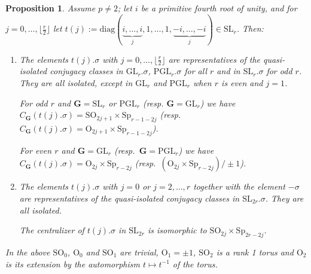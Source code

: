 \documentclass{amsart}
\newtheorem{proposition}[equation]{Proposition}
\numberwithin{equation}{section}
\theoremstyle{definition}
\theoremstyle{remark}
\newcommand\bG{{\mathbf G}}
\newcommand\inv{^{-1}}
\newcommand\GL{\mathrm{GL}}
\newcommand\SL{\mathrm{SL}}
\newcommand\PGL{\mathrm{PGL}}
\newcommand\Orth{\mathrm{O}}
\newcommand\SO{\mathrm{SO}}
\newcommand\Sp{\mathrm{Sp}}
\newcommand\diag{\mathrm{diag}}
\begin{document}
\begin{proposition}
Assume $p\neq 2$; let $i$ be a primitive fourth root of unity,
and for $j=0,\ldots,\lfloor\frac r2\rfloor$ let
$t(j):=\diag(\underbrace{i,\ldots,i}_j,1,\ldots,1,\underbrace{-i,\ldots,-i}_j)
\in\SL_r$.
Then:
\begin{enumerate}
\item  The elements $t(j).\sigma$ with
$j=0,\ldots,\lfloor\frac    r2\rfloor$    are    representatives   of   the
quasi-isolated conjugacy   classes  in
$\GL_r.\sigma$,  $\PGL_r.\sigma$ for all $r$ and in $\SL_r.\sigma$ for odd
$r$.  They are all isolated,
except in $\GL_r$ and $\PGL_r$ when $r$ is even and $j=1$.

For odd $r$ and $\bG=\SL_r$  or  $\PGL_r$ (resp. $\bG=\GL_r$)
we have $C_\bG(t(j).\sigma)=\SO_{2j+1}\times\Sp_{r-1-2j}$
(resp.~$C_\bG(t(j).\sigma)=\Orth_{2j+1}\times\Sp_{r-1-2j}$).

For even $r$ and $\bG=\GL_r$ (resp.~$\bG=\PGL_r$)
we have $C_\bG(t(j).\sigma)=\Orth_{2j}\times\Sp_{r-2j}$
(resp.~$(\Orth_{2j}\times\Sp_{r-2j})/\pm1$).
\item  The  elements
$t(j).\sigma$ with  $j=0$ or $j=2,\ldots, r$  together with the  element
$-\sigma$
are   representatives   of   the quasi-isolated  conjugacy  classes
in $\SL_{2r}.\sigma$. They are all isolated.

The  centralizer  of  $t(j).\sigma$ in $\SL_{2r}$
is isomorphic to $\SO_{2j}\times\Sp_{2r-2j}$. 
\end{enumerate}
In the above $\SO_0$, $\Orth_0$ and
$\SO_1$ are trivial,  $\Orth_1=\pm1$, $\SO_2$ is a rank 1 torus
and $\Orth_2$ is its extension by the
automorphism $t\mapsto t\inv$ of the torus.
\end{proposition}
\end{document}
